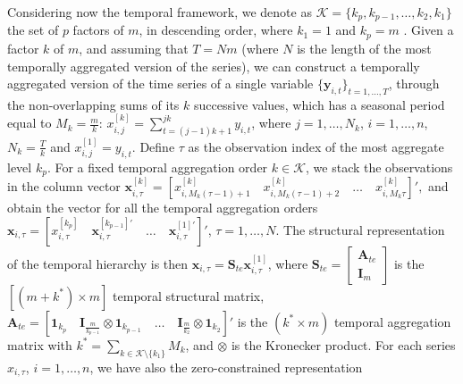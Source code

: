 \documentclass[12pt]{article}
\newcommand{\Unovet}{\bm{1}}
\newcommand{\xvet}{\bm{x}}
\newcommand{\yvet}{\bm{y}}
\newcommand{\Avet}{\bm{A}}
\newcommand{\Ivet}{\bm{I}}
\newcommand{\Svet}{\bm{S}}
\theoremstyle{definition}
\begin{document}
Considering now the temporal framework, we denote as $\mathcal{K} = \{ k_p , k_{p-1}, \dots, k_2, k_1 \}$ the set of $p$ factors of $m$, in descending order, where $k_1= 1$ and $k_p= m$ \citep{athanasopoulos2017}. Given a factor $k$ of $m$, and assuming that $T = N m$ (where $N$ is the length of the most temporally aggregated version of the series), we can construct a temporally aggregated version of the time series of a single variable $\{\yvet_{i,t}\}_{t = 1, \dots, T}$, through the non-overlapping sums of its $k$ successive values, which has a seasonal period equal to $M_k= \displaystyle\frac{m}{k}$: $x_{i,j}^{[k]} = \displaystyle\sum_{t=(j-1)k+1}^{jk} y_{i,t}$, where $j = 1,\dots, N_k$, $i = 1,\dots,n$, $N_k = \displaystyle\frac{T}{k}$ and $x_{i,j}^{[1]}=y_{i,t}$. Define $\tau$ as the observation index of the most aggregate level $k_p$. For a fixed temporal aggregation order $k \in \mathcal{K}$, we stack the observations in the column vector $\xvet_{i,\tau}^{[k]} = \left[x_{i,M_k(\tau-1)+1}^{[k]} \quad x_{i,M_k(\tau-1)+2}^{[k]} \quad \dots \quad x_{i,M_k\tau}^{[k]}\right]',$ and obtain the vector for all the temporal aggregation orders $\xvet_{i,\tau} = \left[x_{i,\tau}^{[k_p]} \quad \xvet_{i,\tau}^{[k_{p-1}]\prime} \quad \dots \quad \xvet_{i,\tau}^{[1]\prime} \right]'$, $\tau = 1,\dots,N$. The structural representation of the temporal hierarchy \citep{athanasopoulos2017} is then $\xvet_{i,\tau} = \Svet_{te}\xvet_{i,\tau}^{[1]}$, where $\Svet_{te} = \left[\begin{array}{c}
	\Avet_{te} \\[-0.25cm]
	\Ivet_{m}
\end{array}\right]$ is the $[(m+k^\ast) \times m]$ temporal structural matrix, $\Avet_{te} = \left[\Unovet_{k_p} \quad \Ivet_{\frac{m}{k_{p-1}}} \otimes \Unovet_{k_{p-1}} \quad \dots \quad \Ivet_{\frac{m}{k_{2}}}  \otimes \Unovet_{k_2} \right]'$
is the $(k^\ast \times m)$ temporal aggregation matrix with $k^\ast = \displaystyle\sum_{k \in \mathcal{K}\setminus\{k_1\}} M_k$, and $\otimes$ is the Kronecker product. For each series $x_{i,\tau}$, $i = 1,\dots,n$, we have also the zero-constrained representation
\end{document}
